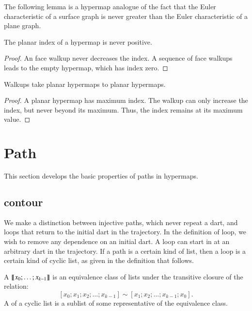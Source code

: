 The following lemma is a hypermap analogue of the fact that the Euler characteristic
of a surface graph is never greater than the Euler characteristic of a plane graph.

\begin{lemma}
\label{lemma:planar-nonpos}  
The planar index
of a hypermap is never positive.
\end{lemma}

\begin{proof}  An face walkup never decreases the index.  A sequence
of face walkups leads to the empty hypermap, which has
index zero.
\end{proof}


\begin{lemma}
\label{lemma:walkup-planar}
Walkups take planar hypermaps to planar
hypermaps.
\end{lemma}

\begin{proof}  
A planar hypermap has maximum index.  The walkup
can only increase the index, but never beyond its maximum.  
Thus, the index remains at its maximum value.
\end{proof}





\section{Path}

This section develops the basic properties of paths in hypermaps.


\subsection{contour}

We make a distinction between injective paths, which never
repeat a dart, and loops that return to the initial dart in the trajectory.
In the definition of loop, we wish to remove any dependence on an initial dart.
A loop can start in at an arbitrary dart in the trajectory.  If a path is a certain
kind of list, then a loop is a certain kind of cyclic list, as given in the
definition that follows.

\begin{definition}\label{def:cyclic:list}
   
  A  ${\llbracket{x_0;\ldots;x_{k-1}}\rrbracket}$ is an equivalence
  class of lists under the transitive closure of the relation:
\[ 
[x_0;x_1;x_2;\ldots;x_{k-1}] \sim [x_1;x_2;\ldots;x_{k-1};x_0].
\] 
A  of a cyclic list is a sublist of some representative of the
equivalence class.
\end{definition}


